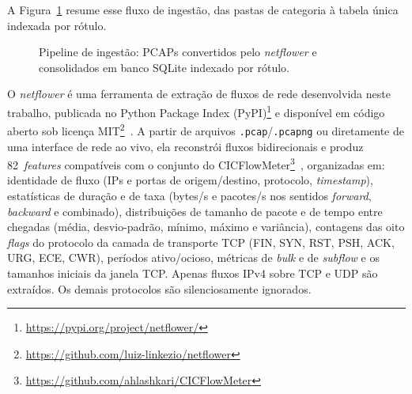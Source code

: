 \documentclass[12pt]{article}
\begin{document}
A Figura~\ref{fig:pipeline} resume esse fluxo de ingestão, das pastas de
categoria à tabela única indexada por rótulo.

\begin{figure}[ht]
\centering
{}
\caption{Pipeline de ingestão: PCAPs convertidos pelo \textit{netflower} e consolidados em banco SQLite indexado por rótulo.}
\label{fig:pipeline}
\end{figure}

O \textit{netflower} é uma
ferramenta de extração de fluxos de rede desenvolvida neste trabalho, publicada no
Python Package Index (PyPI)\footnote{\url{https://pypi.org/project/netflower/}} e
disponível em código aberto sob licença MIT\footnote{\url{https://github.com/luiz-linkezio/netflower}}~\cite{netflower}.
A partir de arquivos \texttt{.pcap}/\texttt{.pcapng} ou diretamente de uma interface
de rede ao vivo, ela reconstrói fluxos bidirecionais e produz 82~\textit{features}
compatíveis com o conjunto do CICFlowMeter\footnote{\url{https://github.com/ahlashkari/CICFlowMeter}}~\cite{cicflowmeter},
organizadas em: identidade de fluxo
(IPs e portas de origem/destino, protocolo, \textit{timestamp}), estatísticas de
duração e de taxa (bytes/s e pacotes/s nos sentidos \textit{forward},
\textit{backward} e combinado), distribuições de tamanho de pacote e de tempo
entre chegadas (média, desvio-padrão, mínimo, máximo e variância), contagens das
oito \textit{flags} do protocolo da camada de transporte TCP (FIN, SYN, RST, PSH, ACK, URG, ECE, CWR), períodos
ativo/ocioso, métricas de \textit{bulk} e de \textit{subflow} e os tamanhos
iniciais da janela TCP. Apenas fluxos IPv4 sobre TCP e UDP são extraídos. Os
demais protocolos são silenciosamente ignorados.
\end{document}
